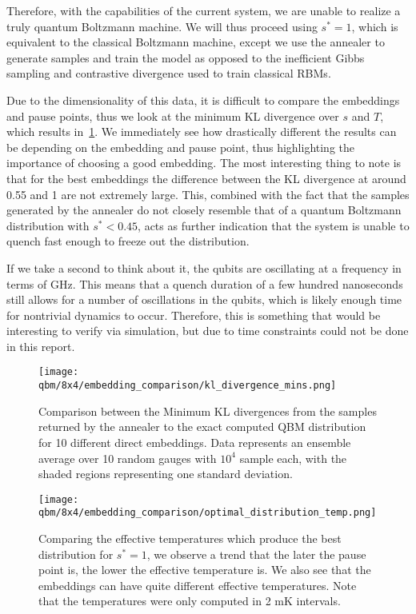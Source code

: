 Therefore, with the capabilities of the current system, we are unable to realize a truly quantum Boltzmann machine.
We will thus proceed using \( s^* = 1 \), which is equivalent to the classical Boltzmann machine, except we use the annealer to generate samples and train the model as opposed to the inefficient Gibbs sampling and contrastive divergence used to train classical RBMs.

Due to the dimensionality of this data, it is difficult to compare the embeddings and pause points, thus we look at the minimum KL divergence over \( s \) and \( T \), which results in~\cref{fig:dkl_mins_embeddings}.
We immediately see how drastically different the results can be depending on the embedding and pause point, thus highlighting the importance of choosing a good embedding.
The most interesting thing to note is that for the best embeddings the difference between the KL divergence at around 0.55 and 1 are not extremely large.
This, combined with the fact that the samples generated by the annealer do not closely resemble that of a quantum Boltzmann distribution with \( s^* < 0.45 \), acts as further indication that the system is unable to quench fast enough to freeze out the distribution.

If we take a second to think about it, the qubits are oscillating at a frequency in terms of GHz.
This means that a quench duration of a few hundred nanoseconds still allows for a number of oscillations in the qubits, which is likely enough time for nontrivial dynamics to occur.
Therefore, this is something that would be interesting to verify via simulation, but due to time constraints could not be done in this report.

\begin{figure}[!htb]
    \begin{center}
        \texttt{[image: qbm/8x4/embedding\_comparison/kl\_divergence\_mins.png]}
    \end{center}
    \caption{Comparison between the Minimum KL divergences from the samples returned by the annealer to the exact computed QBM distribution for 10 different direct embeddings. Data represents an ensemble average over 10 random gauges with \( 10^4 \) sample each, with the shaded regions representing one standard deviation.}
    \label{fig:dkl_mins_embeddings}
\end{figure}

\begin{figure}[!htb]
    \begin{center}
        \texttt{[image: qbm/8x4/embedding\_comparison/optimal\_distribution\_temp.png]}
    \end{center}
    \caption{Comparing the effective temperatures which produce the best distribution for \( s^* = 1 \), we observe a trend that the later the pause point is, the lower the effective temperature is. We also see that the embeddings can have quite different effective temperatures. Note that the temperatures were only computed in 2 \si{\milli\kelvin} intervals.}
    \label{fig:optimal_distribution_temp}
\end{figure}

